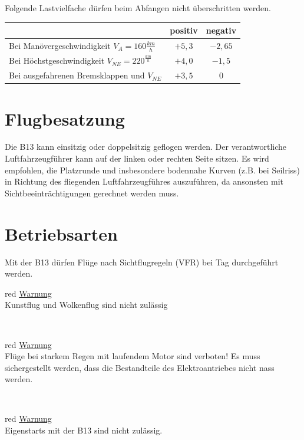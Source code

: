Folgende Lastvielfache dürfen beim Abfangen nicht überschritten werden.\\
\newline
\begin{tabular}{|l|c|c|}
\hline
& positiv & negativ \\
\hline
Bei Manövergeschwindigkeit $V_A=160\frac{km}{h}$ & $+5,3$ & $-2,65$\\
\hline
Bei Höchstgeschwindigkeit $V_{NE}=220^\frac{km}{h}$ & $+4,0$ & $-1,5$ \\
\hline
Bei ausgefahrenen Bremsklappen und $V_{NE}$ & $+3,5$ & $0$\\
\hline
\end{tabular}

\section{Flugbesatzung}
Die B13 kann einsitzig oder doppelsitzig geflogen werden. Der verantwortliche Luftfahrzeugführer kann auf der linken oder rechten Seite sitzen. Es wird empfohlen, die Platzrunde und insbesondere bodennahe Kurven (z.B. bei Seilriss) in Richtung des fliegenden Luftfahrzeugführes auszuführen, da ansonsten mit Sichtbeeinträchtigungen gerechnet werden muss.

\section{Betriebsarten}
Mit der B13 dürfen Flüge nach Sichtflugregeln (VFR) bei Tag durchgeführt werden.\\
\newline
\begin{color}{red} \large{\underline{Warnung}}\\
Kunstflug und Wolkenflug sind nicht zulässig
\end{color}\\

\begin{color}{red}
\large{\underline{Warnung}}\\
Flüge bei starkem Regen mit laufendem Motor sind verboten! Es
muss sichergestellt werden, dass die Bestandteile des Elektroantriebes nicht nass werden.
\end{color}\\

\begin{color}{red}
\large{\underline{Warnung}}\\

Eigenstarts mit der B13 sind nicht zulässig.
\end{color}
\newpage

